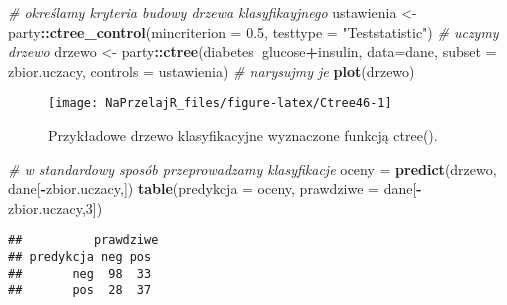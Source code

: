 \documentclass[polish,]{book}
\newenvironment{Shaded}{\begin{snugshade}}{\end{snugshade}}
\newcommand{\CommentTok}[1]{\textcolor[rgb]{0.56,0.35,0.01}{\textit{#1}}}
\newcommand{\DataTypeTok}[1]{\textcolor[rgb]{0.13,0.29,0.53}{#1}}
\newcommand{\DecValTok}[1]{\textcolor[rgb]{0.00,0.00,0.81}{#1}}
\newcommand{\FloatTok}[1]{\textcolor[rgb]{0.00,0.00,0.81}{#1}}
\newcommand{\KeywordTok}[1]{\textcolor[rgb]{0.13,0.29,0.53}{\textbf{#1}}}
\newcommand{\NormalTok}[1]{#1}
\newcommand{\OperatorTok}[1]{\textcolor[rgb]{0.81,0.36,0.00}{\textbf{#1}}}
\newcommand{\StringTok}[1]{\textcolor[rgb]{0.31,0.60,0.02}{#1}}
\begin{document}
\begin{Shaded}
\begin{Highlighting}[]
\CommentTok{# określamy kryteria budowy drzewa klasyfikayjnego}
\NormalTok{ustawienia <-}\StringTok{ }\NormalTok{party}\OperatorTok{::}\KeywordTok{ctree_control}\NormalTok{(}\DataTypeTok{mincriterion =} \FloatTok{0.5}\NormalTok{, }\DataTypeTok{testtype =} \StringTok{"Teststatistic"}\NormalTok{)}
\CommentTok{# uczymy drzewo}
\NormalTok{drzewo <-}\StringTok{ }\NormalTok{party}\OperatorTok{::}\KeywordTok{ctree}\NormalTok{(diabetes}\OperatorTok{~}\NormalTok{glucose}\OperatorTok{+}\NormalTok{insulin,}
                       \DataTypeTok{data=}\NormalTok{dane, }\DataTypeTok{subset =}\NormalTok{ zbior.uczacy, }\DataTypeTok{controls =}\NormalTok{ ustawienia)}
\CommentTok{# narysujmy je}
\KeywordTok{plot}\NormalTok{(drzewo)}
\end{Highlighting}
\end{Shaded}

\begin{figure}[h]

{\centering \texttt{[image: NaPrzelajR\_files/figure-latex/Ctree46-1]} 

}

\caption{Przykładowe drzewo klasyfikacyjne wyznaczone funkcją ctree().}\label{fig:Ctree46}
\end{figure}

\begin{Shaded}
\begin{Highlighting}[]
\CommentTok{# w standardowy sposób przeprowadzamy klasyfikacje}
\NormalTok{oceny =}\StringTok{ }\KeywordTok{predict}\NormalTok{(drzewo, dane[}\OperatorTok{-}\NormalTok{zbior.uczacy,])}
\KeywordTok{table}\NormalTok{(}\DataTypeTok{predykcja =}\NormalTok{ oceny, }\DataTypeTok{prawdziwe =}\NormalTok{ dane[}\OperatorTok{-}\NormalTok{zbior.uczacy,}\DecValTok{3}\NormalTok{])}
\end{Highlighting}
\end{Shaded}

\begin{verbatim}
##          prawdziwe
## predykcja neg pos
##       neg  98  33
##       pos  28  37
\end{verbatim}
\end{document}
